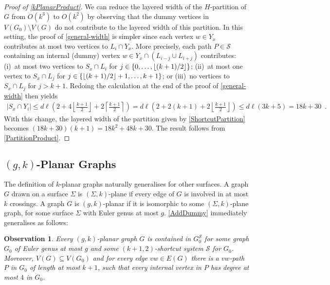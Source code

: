 \documentclass{patmorin}
\theoremstyle{plain}
\newtheorem{obs}[thm]{Observation}
\theoremstyle{definition}
\DeclarePairedDelimiter{\floor}{\lfloor}{\rfloor}
\renewcommand{\SS}{\mathcal{S}}
\renewcommand{\le}{\leqslant}
\begin{document}
\begin{proof}[Proof of \cref{kPlanarProduct}]
	We can reduce the layered width of the $H$-partition of $G$ from $O(k^3)$ to $O(k^2)$ by observing that the dummy vertices in $V(G_0)\setminus V(G)$ do not contribute to the layered width of this partition.  In this setting, the proof of \cref{general-width} is simpler since each vertex $w\in Y_x$ contributes at most two vertices to $L_i\cap Y_x$.  More precisely, each path $P\in\SS$ containing an internal (dummy) vertex $w\in Y_x\cap (L_{i-j}\cup L_{i+j})$ contributes: (i)~at most two vertices to $S_x\cap L_i$ for $j\in\{0,\ldots,\floor{(k+1)/2}\}$; (ii)~at most one vertex to $S_x\cap L_j$ for $j\in\{\floor{(k+1)/2}+1,\ldots,k+1\}$; or (iii)~no vertices to $S_x\cap L_j$ for $j > k+1$.
	Redoing the calculation at the end of the proof of \cref{general-width} then yields
	\begin{align*}
	|S_x\cap Y_i| \le d\ell\left(
	2
	+ 4\left\lfloor\tfrac{k+1}{2}\right\rfloor
	+ 2\left\lceil\tfrac{k+1}{2}\right\rceil
	\right)
	 =
	d\ell\left(
	2 + 2(k+1) + 2\left\lfloor\tfrac{k+1}{2}\right\rfloor
	\right)
	 \le
	d\ell(3k+5)
	= 18k+30 \enspace .
	\end{align*}
	With this change, the layered width of the partition given by \cref{ShortcutPartition} becomes $(18k+30)(k+1)=18k^2+48k+30$.
	The result follows from \cref{PartitionProduct}.
\end{proof}



\subsection{\boldmath $(g,k)$-Planar Graphs}

The definition of $k$-planar graphs naturally generalises for other surfaces. A graph $G$ drawn on a surface $\Sigma$ is $(\Sigma,k)$-plane if every edge of $G$ is involved in at most $k$ crossings.  A graph $G$ is $(g,k)$-planar if it is isomorphic to some $(\Sigma,k)$-plane graph, for some surface $\Sigma$ with Euler genus at most $g$. \cref{AddDummy} immediately generalises as follows:

\begin{obs}
\label{gAddDummy}
Every $(g,k)$-planar graph $G$ is contained in $G_0^\SS$ for some graph $G_0$ of Euler genus at most $g$ and some $(k+1,2)$-shortcut system $\SS$ for $G_0$. Moreover, $V(G) \subseteq V(G_0)$ and for every edge $vw \in E(G)$ there is a $vw$-path $P$ in $G_0$ of length at most $k+1$, such that every internal vertex in $P$ has degree at most $4$ in $G_0$.
\end{obs}
\end{document}
